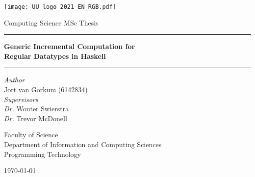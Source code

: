 \begin{titlepage}
  \fontsize{12pt}{15pt}\selectfont
  \begin{center}
    \vspace*{\fill}
    \texttt{[image: UU\_logo\_2021\_EN\_RGB.pdf]}

    \vspace{1.75cm}

    Computing Science MSc Thesis

    \vspace{0.55cm}

    \hrule
    \vspace{0.4cm}
    {
      \fontsize{20.74pt}{20.74pt}\selectfont
      \parbox[]{13cm} {
        \centering
        \textbf{Generic Incremental Computation for \\ Regular Datatypes in Haskell}
      }
    }
    \vspace{0.5cm}
    \hrule
      
    \vspace{2.0cm}
    
    \begin{multicols}{2}
      \textit{Author} \\
      Jort van Gorkum (6142834) \\
    \columnbreak
      \textit{Supervisors} \\
      \textit{Dr.} Wouter Swierstra \\
      \textit{Dr.} Trevor McDonell \\
    \end{multicols}

    
    \vspace{2.0cm}

    \begin{small}
      Faculty of Science \\
      Department of Information and Computing Sciences \\
      Programming Technology \\
    \end{small}
    
    \vspace{1.5cm}

    \monthyeardate\today
  \end{center}
\end{titlepage}
